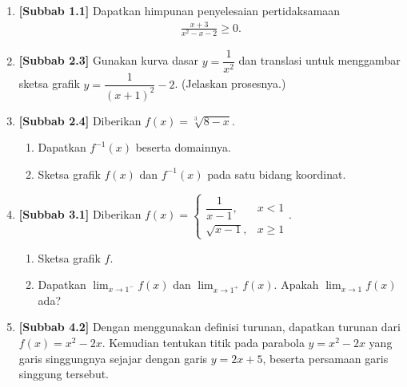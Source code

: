 \documentclass[10pt,openany,a4paper]{article}
\theoremstyle{definition}
\theoremstyle{definition}
\theoremstyle{plain}
\begin{document}
\begin{enumerate}
    \item \textbf{[Subbab 1.1]} Dapatkan himpunan penyelesaian pertidaksamaan
    \begin{align*}
        \frac{x+3}{x^2-x-2}\geq 0.
    \end{align*}

    \item \textbf{[Subbab 2.3]} Gunakan kurva dasar $y=\dfrac{1}{x^2}$ dan translasi untuk menggambar sketsa grafik $y=\dfrac{1}{(x+1)^2}-2$. (Jelaskan prosesnya.)

    \item \textbf{[Subbab 2.4]} Diberikan $f(x)=\sqrt[3]{8-x}$.
    \begin{enumerate}
        \item Dapatkan $f^{-1}(x)$ beserta domainnya.
        \item Sketsa grafik $f(x)$ dan $f^{-1}(x)$ pada satu bidang koordinat.
    \end{enumerate}

    \item \textbf{[Subbab 3.1]} Diberikan $f(x)=\begin{cases}
        \dfrac{1}{x-1}, & x<1\\[2mm]
        \sqrt{x-1}, & x\geq 1
    \end{cases}$.
    \begin{enumerate}
        \item Sketsa grafik $f$.
        \item Dapatkan $\displaystyle\lim_{x\to 1^-}f(x)$ dan $\displaystyle\lim_{x\to 1^+}f(x)$. Apakah $\displaystyle\lim_{x\to 1}f(x)$ ada?
    \end{enumerate}

    \item \textbf{[Subbab 4.2]} Dengan menggunakan definisi turunan, dapatkan turunan dari $f(x)=x^2-2x$. Kemudian tentukan titik pada parabola $y=x^2-2x$ yang garis singgungnya sejajar dengan garis $y=2x+5$, beserta persamaan garis singgung tersebut.
\end{enumerate}

\newpage
\end{document}
